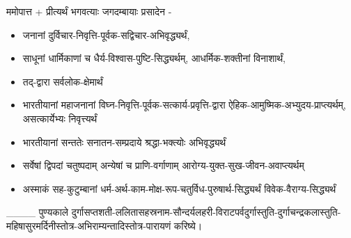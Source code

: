 \setcounter{page}{0}
\sectionmark{\mbox{}}
\renewcommand{\chaptermark}[1]{%
\markboth{\large #1}{}}
\begin{center}
\label{sec:start}

ममोपात्त + प्रीत्यर्थं भगवत्याः जगदम्बायाः प्रसादेन -
\begin{itemize}\addtolength{\itemsep}{-1ex}
\item जनानां दुर्विचार-निवृत्ति-पूर्वक-सद्विचार-अभिवृद्ध्यर्थं,
\item साधूनां धार्मिकाणां च धैर्य-विश्वास-पुष्टि-सिद्ध्यर्थम्, आधर्मिक-शक्तीनां विनाशार्थं,
\item तद्-द्वारा सर्वलोक-क्षेमार्थं

\item भारतीयानां महाजनानां विघ्न-निवृत्ति-पूर्वक-सत्कार्य-प्रवृत्ति-द्वारा ऐहिक-आमुष्मिक-अभ्युदय-प्राप्त्यर्थम्, असत्कार्येभ्यः निवृत्त्यर्थं

\item भारतीयानां सन्ततेः सनातन-सम्प्रदाये श्रद्धा-भक्त्योः अभिवृद्ध्यर्थं

\item सर्वेषां द्विपदां चतुष्पदाम् अन्येषां च प्राणि-वर्गाणाम् आरोग्य-युक्त-सुख-जीवन-अवाप्त्यर्थम्

\item अस्माकं सह-कुटुम्बानां धर्म-अर्थ-काम-मोक्ष-रूप-चतुर्विध-पुरुषार्थ-सिद्ध्यर्थं विवेक-वैराग्य-सिद्ध्यर्थं
\end{itemize}
\_\_\_\_ पुण्यकाले 
दुर्गासप्तशती-ललितासहस्रनाम-सौन्दर्यलहरी-विराटपर्वदुर्गास्तुति-दुर्गाचन्द्रकलास्तुति-महिषासुरमर्दिनीस्तोत्र-अभिराम्यन्तादिस्तोत्र-पारायणं करिष्ये।










\hyperref[sec:start]{\closesection}





\closesection
\end{center}
